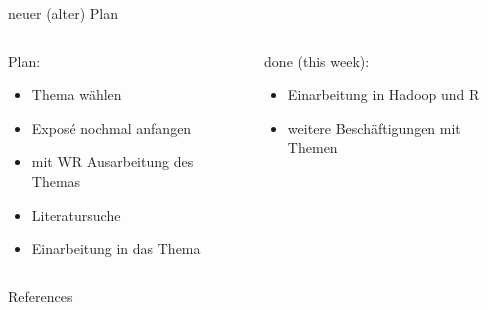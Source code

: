 \documentclass{beamer}
\begin{document}
\begin{frame}{neuer (alter) Plan}
\begin{columns}[t]
    \begin{column}{.5\textwidth}      	
      	\begin{block}{Plan:}
        	\begin{itemize}
				\item Thema wählen
	   			\item Exposé nochmal anfangen
		        \item mit WR Ausarbeitung des Themas
				\item Literatursuche
		    	\item Einarbeitung in das Thema
			\end{itemize}
    	\end{block}
    \end{column}
	\begin{column}{.5\textwidth}
		\uncover<2> {
		\begin{block}{done (this week):}
        	\begin{itemize}
	        	\item Einarbeitung in Hadoop und R
    	    	\item weitere Beschäftigungen mit Themen
        	\end{itemize}
		\end{block}
		}
	\end{column}
\end{columns}
\end{frame}

\begin{frame}[shrink=10]{References}
\nocite{*}

 
\end{frame}
\end{document}
